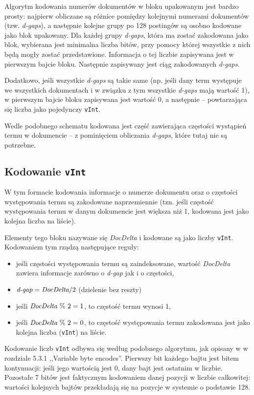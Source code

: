 Algorytm kodowania numerów dokumentów w bloku upakowanym jest bardzo prosty: najpierw obliczane są różnice pomiędzy kolejnymi numerami dokumentów (tzw. \emph{d-gaps}), a następnie kolejne grupy po 128 postingów są osobno kodowane jako blok upakowany. Dla każdej grupy \emph{d-gaps}, która ma zostać zakodowana jako blok, wybierana jest minimalna liczba bitów, przy pomocy której wszystkie z nich będą mogły zostać przedstawione. Informacja o tej liczbie zapisywana jest w pierwszym bajcie bloku. Następnie zapisywany jest ciąg zakodowanych \emph{d-gaps}.

Dodatkowo, jeśli wszystkie \emph{d-gaps} są takie same (np. jeśli dany term występuje we wszystkich dokumentach i w związku z tym wszystkie \emph{d-gaps} mają wartość 1), w pierwszym bajcie bloku zapisywana jest wartość 0, a następnie -- powtarzająca się liczba jako pojedynczy \texttt{vInt}.

Wedle podobnego schematu kodowana jest część zawierająca częstości wystąpień termu w dokumencie -- z pominięciem obliczania \emph{d-gaps}, które tutaj nie są potrzebne.

\subsection{Kodowanie \texttt{vInt}}
\label{sec:vIntEncoding}

W tym formacie kodowania informacje o numerze dokumentu oraz o częstości występowania termu są zakodowane naprzemiennie (tzn. jeśli częstość występowania termu w danym dokumencie jest większa niż 1, kodowana jest jako kolejna liczba na liście). 

Elementy tego bloku nazywane się \emph{DocDelta} i kodowane są jako liczby \texttt{vInt}. Kodowaniem tym rządzą następujące reguły:
\begin{itemize}
 \item jeśli częstości występowania termu są zaindeksowane, wartość \emph{DocDelta} zawiera informacje zarówno o \emph{d-gap} jak i o częstości,
 \item $\emph{d-gap} = \emph{DocDelta} / 2$ (dzielenie bez reszty)
 \item jeśli $\emph{DocDelta}~\%~2 = 1$, to częstość termu wynosi 1,
 \item jeśli $\emph{DocDelta}~\%~2 = 0$, to częstość występowania termu zakodowana jest jako kolejna liczba (\texttt{vInt}) na liście.
\end{itemize}

Kodowanie liczb \texttt{vInt} odbywa się według podobnego algorytmu, jak opisany w \cite{irbook} w rozdziale 5.3.1 ,,Variable byte encodes''. Pierwszy bit każdego bajtu jest bitem kontynuacji: jeśli jego wartością jest 0, dany bajt jest ostatnim w liczbie. Pozostałe 7 bitów jest faktycznym kodowaniem danej pozycji w liczbie całkowitej: wartości kolejnych bajtów przekładają się na pozycje w systemie o podstawie 128.